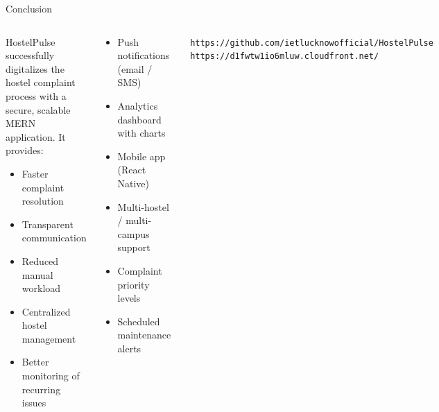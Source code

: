 \documentclass[aspectratio=169]{beamer}
\begin{document}
\begin{frame}{Conclusion}{}
  \begin{columns}[t]
    \begin{tcolorbox}[infobox, title={\color{white}\small\bfseries\faFlag\ Summary},
        colbacktitle=TealPrimary]
      {\small HostelPulse successfully digitalizes the hostel
      complaint process with a secure, scalable MERN
      application. It provides:}
      \begin{itemize}\setlength\itemsep{0.2em}
        \item Faster complaint resolution
        \item Transparent communication
        \item Reduced manual workload
        \item Centralized hostel management
        \item Better monitoring of recurring issues
      \end{itemize}
    \end{tcolorbox}

    \begin{tcolorbox}[featurebox,
        title={\color{white}\small\bfseries\faRocket\ Future Enhancements},
        colbacktitle=NavyBlue]
      \begin{itemize}\setlength\itemsep{0.25em}
        \item Push notifications (email / SMS)
        \item Analytics dashboard with charts
        \item Mobile app (React Native)
        \item Multi-hostel / multi-campus support
        \item Complaint priority levels
        \item Scheduled maintenance alerts
      \end{itemize}
    \end{tcolorbox}
    \vspace{0.2cm}
    \begin{tcolorbox}[accentbox]
      {\color{TealPrimary}\small\faGithub}\
      {\small\texttt{https://github.com/ietlucknowofficial/HostelPulse}}\\[3pt]
      {\color{TealPrimary}\small\faCloud}\
      {\small\texttt{https://d1fwtw1io6mluw.cloudfront.net/}}
    \end{tcolorbox}
  \end{columns}
\end{frame}
\end{document}
